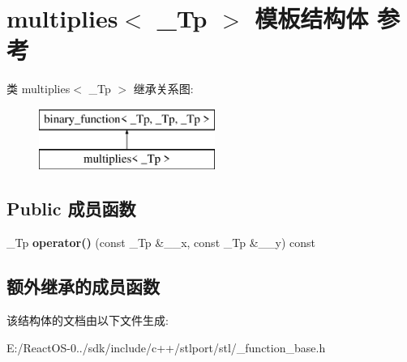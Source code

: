 \hypertarget{structmultiplies}{}\section{multiplies$<$ \+\_\+\+Tp $>$ 模板结构体 参考}
\label{structmultiplies}
类 multiplies$<$ \+\_\+\+Tp $>$ 继承关系图\+:\begin{figure}[H]
\begin{center}
\leavevmode
\includegraphics[height=2.000000cm]{structmultiplies}
\end{center}
\end{figure}
\subsection*{Public 成员函数}
\begin{DoxyCompactItemize}
\item 
\mbox{\label{structmultiplies_a3a36f9d73eeed3f255596621f433866c}} 
\+\_\+\+Tp {\bfseries operator()} (const \+\_\+\+Tp \&\+\_\+\+\_\+x, const \+\_\+\+Tp \&\+\_\+\+\_\+y) const
\end{DoxyCompactItemize}
\subsection*{额外继承的成员函数}


该结构体的文档由以下文件生成\+:\begin{DoxyCompactItemize}
\item 
E\+:/\+React\+O\+S-\/0../sdk/include/c++/stlport/stl/\+\_\+function\+\_\+base.\+h\end{DoxyCompactItemize}
